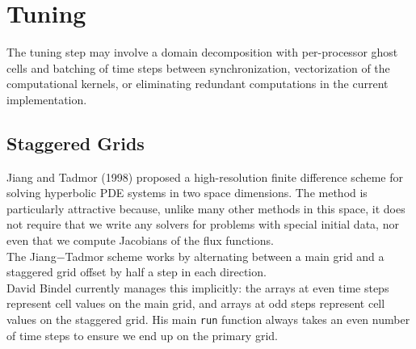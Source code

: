 \documentclass[12pt]{article}
\numberwithin{equation}{section}
\begin{document}
%
%
%
%


\section{Tuning}

The tuning step may involve a domain decomposition with per-processor ghost cells and batching of time steps between synchronization, vectorization of the computational kernels, or eliminating redundant computations in the current implementation.

\subsection{Staggered Grids}

Jiang and Tadmor (1998) proposed a high-resolution finite difference scheme for solving hyperbolic PDE systems in two space dimensions. The method is particularly attractive because, unlike many other methods in this space, it does not require that we write any solvers for problems with special initial data, nor even that we compute Jacobians of the flux functions.
\\
The Jiang$-$Tadmor scheme works by alternating between a main grid and a staggered grid offset by half a step in each direction.
\\
David Bindel currently manages this implicitly: the arrays at even time steps represent cell values on the main grid, and arrays at odd steps represent cell values on the staggered grid. His main \texttt{run} function always takes an even number of time steps to ensure we end up on the primary grid.
\end{document}
